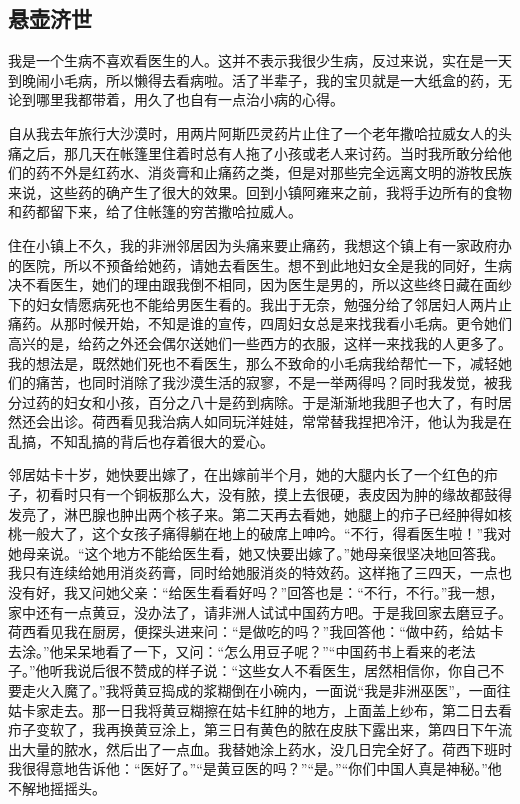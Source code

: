 \subsection{悬壶济世}

\par 我是一个生病不喜欢看医生的人。这并不表示我很少生病，反过来说，实在是一天到晚闹小毛病，所以懒得去看病啦。活了半辈子，我的宝贝就是一大纸盒的药，无论到哪里我都带着，用久了也自有一点治小病的心得。
\par 自从我去年旅行大沙漠时，用两片阿斯匹灵药片止住了一个老年撒哈拉威女人的头痛之后，那几天在帐篷里住着时总有人拖了小孩或老人来讨药。当时我所敢分给他们的药不外是红药水、消炎膏和止痛药之类，但是对那些完全远离文明的游牧民族来说，这些药的确产生了很大的效果。回到小镇阿雍来之前，我将手边所有的食物和药都留下来，给了住帐篷的穷苦撒哈拉威人。
\par 住在小镇上不久，我的非洲邻居因为头痛来要止痛药，我想这个镇上有一家政府办的医院，所以不预备给她药，请她去看医生。想不到此地妇女全是我的同好，生病决不看医生，她们的理由跟我倒不相同，因为医生是男的，所以这些终日藏在面纱下的妇女情愿病死也不能给男医生看的。我出于无奈，勉强分给了邻居妇人两片止痛药。从那时候开始，不知是谁的宣传，四周妇女总是来找我看小毛病。更令她们高兴的是，给药之外还会偶尔送她们一些西方的衣服，这样一来找我的人更多了。我的想法是，既然她们死也不看医生，那么不致命的小毛病我给帮忙一下，减轻她们的痛苦，也同时消除了我沙漠生活的寂寥，不是一举两得吗？同时我发觉，被我分过药的妇女和小孩，百分之八十是药到病除。于是渐渐地我胆子也大了，有时居然还会出诊。荷西看见我治病人如同玩洋娃娃，常常替我捏把冷汗，他认为我是在乱搞，不知乱搞的背后也存着很大的爱心。
\par 邻居姑卡十岁，她快要出嫁了，在出嫁前半个月，她的大腿内长了一个红色的疖子，初看时只有一个铜板那么大，没有脓，摸上去很硬，表皮因为肿的缘故都鼓得发亮了，淋巴腺也肿出两个核子来。第二天再去看她，她腿上的疖子已经肿得如核桃一般大了，这个女孩子痛得躺在地上的破席上呻吟。“不行，得看医生啦！”我对她母亲说。“这个地方不能给医生看，她又快要出嫁了。”她母亲很坚决地回答我。我只有连续给她用消炎药膏，同时给她服消炎的特效药。这样拖了三四天，一点也没有好，我又问她父亲：“给医生看看好吗？”回答也是：“不行，不行。”我一想，家中还有一点黄豆，没办法了，请非洲人试试中国药方吧。于是我回家去磨豆子。荷西看见我在厨房，便探头进来问：“是做吃的吗？”我回答他：“做中药，给姑卡去涂。”他呆呆地看了一下，又问：“怎么用豆子呢？”“中国药书上看来的老法子。”他听我说后很不赞成的样子说：“这些女人不看医生，居然相信你，你自己不要走火入魔了。”我将黄豆捣成的浆糊倒在小碗内，一面说“我是非洲巫医”，一面往姑卡家走去。那一日我将黄豆糊擦在姑卡红肿的地方，上面盖上纱布，第二日去看疖子变软了，我再换黄豆涂上，第三日有黄色的脓在皮肤下露出来，第四日下午流出大量的脓水，然后出了一点血。我替她涂上药水，没几日完全好了。荷西下班时我很得意地告诉他：“医好了。”“是黄豆医的吗？”“是。”“你们中国人真是神秘。”他不解地摇摇头。

